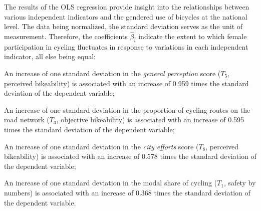 \begin{refsegment}
The results of the \acrshort{OLS} regression provide insight into the relationships between various independent indicators and the gendered use of bicycles at the national level. The data being normalized, the standard deviation serves as the unit of measurement. Therefore, the coefficients $\hat{\beta}_{i}$ indicate the extent to which female participation in cycling fluctuates in response to variations in each independent indicator, all else being equal:
\begin{customitemize}
    \item An increase of one standard deviation in the \textsl{general perception} score (\(T_{5}\), perceived bikeability) is associated with an increase of 0.959 times the standard deviation of the dependent variable;
    \item An increase of one standard deviation in the proportion of cycling routes on the road network (\(T_{3}\), objective bikeability) is associated with an increase of 0.595 times the standard deviation of the dependent variable;
    \item An increase of one standard deviation in the \textsl{city efforts} score (\(T_{8}\), perceived bikeability) is associated with an increase of 0.578 times the standard deviation of the dependent variable;
    \item An increase of one standard deviation in the modal share of cycling (\(T_{1}\), safety by numbers) is associated with an increase of 0.368 times the standard deviation of the dependent variable.
\end{customitemize}%


\end{refsegment}
